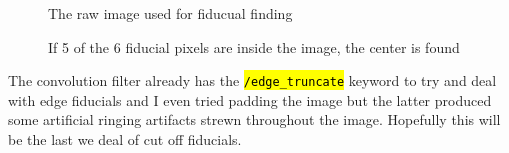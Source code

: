 \documentclass[10pt]{scrartcl}
\begin{document}
\begin{figure}[!ht]
    \begin{subfloatrow}[2]%
       {%
       \caption{The raw image used for fiducual finding}%
       }%
       {%
       \caption{If 5 of the 6 fiducial pixels are inside the image, the center is found}%
       \label{ohyeah}%
       }%
    \end{subfloatrow}
\end{figure}

The convolution filter already has the \hl{\texttt{/edge\_truncate}} keyword to try and deal with edge fiducials and I even tried padding the image but the latter produced some artificial ringing artifacts strewn throughout the image. Hopefully this will be the last we deal of cut off fiducials.

\end{document}
